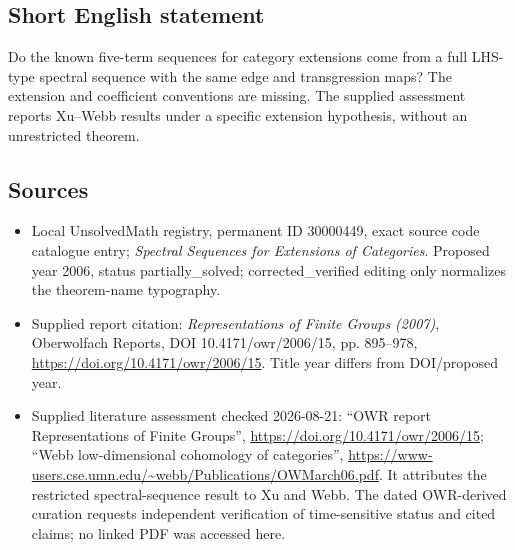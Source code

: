 \documentclass[11pt]{article}
\begin{document}
\subsection{Short English statement}
Do the known five-term sequences for category extensions come from a full LHS-type spectral sequence with the same edge and transgression maps? The extension and coefficient conventions are missing. The supplied assessment reports Xu--Webb results under a specific extension hypothesis, without an unrestricted theorem.
\subsection{Sources}
\begin{itemize}
\item Local UnsolvedMath registry, permanent ID 30000449, exact source code catalogue entry; \emph{Spectral Sequences for Extensions of Categories}. Proposed year 2006, status partially\_solved; corrected\_verified editing only normalizes the theorem-name typography.
\item Supplied report citation: \emph{Representations of Finite Groups (2007)}, Oberwolfach Reports, DOI 10.4171/owr/2006/15, pp. 895--978, \url{https://doi.org/10.4171/owr/2006/15}. Title year differs from DOI/proposed year.
\item Supplied literature assessment checked 2026-08-21: ``OWR report Representations of Finite Groups'', \url{https://doi.org/10.4171/owr/2006/15}; ``Webb low-dimensional cohomology of categories'', \url{https://www-users.cse.umn.edu/~webb/Publications/OWMarch06.pdf}. It attributes the restricted spectral-sequence result to Xu and Webb. The dated OWR-derived curation requests independent verification of time-sensitive status and cited claims; no linked PDF was accessed here.
\end{itemize}
\end{document}

